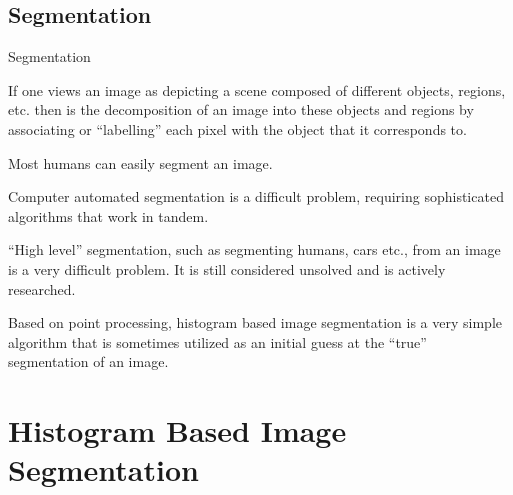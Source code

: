\subsection{Segmentation}
%
%
\begin{slide}{Segmentation}
\begin{titlelist}{}{}
\small
\item<2-> If one views an image as depicting a scene
composed of different objects, regions, etc.
then  is the 
decomposition of an image into these objects and regions 
by associating or ``labelling'' each pixel with the object that it corresponds to.

\item<3-> Most humans can easily segment an image. 

\item<4-> Computer automated segmentation is a difficult problem,
requiring sophisticated algorithms that work in tandem.

\item<5-> ``High level'' segmentation, such as segmenting humans,
cars etc., from an image is a very difficult problem.
It is still considered unsolved and is actively researched.

\item<6-> Based on point processing, histogram based image segmentation is a very simple algorithm
that is sometimes utilized as an initial guess at the ``true''
segmentation of an image. 

\end{titlelist}

\end{slide}



%
%
\section{Histogram Based Image Segmentation}

